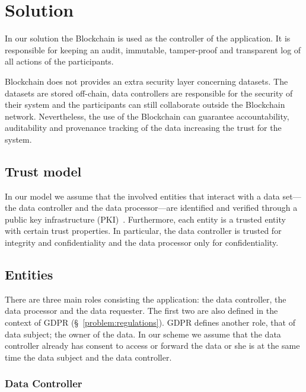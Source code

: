\chapter{Solution}
\label{solution}

In our solution the Blockchain is used as the controller of the application. It is responsible for keeping an
audit, immutable, tamper-proof and transparent log of all actions of the participants.

Blockchain does not provides an extra security layer concerning datasets. The datasets are stored off-chain, data controllers are responsible for the security of their system and the participants can still collaborate outside the Blockchain network. Nevertheless, the use of the Blockchain can guarantee accountability, auditability and provenance tracking of the data increasing the trust for the system.

\section{Trust model}
\label{solution:trust_model}

In our model we assume that the involved entities that interact with a data set---the data controller and the data processor---are identified and verified through a public key infrastructure (PKI)~\cite{adams_understanding_2003}. Furthermore, each entity is a trusted entity with certain trust properties. In particular, the data controller is trusted for integrity and confidentiality and the data processor only for confidentiality.

\section{Entities}
\label{solution:entities}

There are three main roles consisting the application: the data controller, the data processor
and the data requester. The first two are also defined in the context of GDPR (§~\ref{problem:regulations}).
GDPR defines another role, that of data subject; the owner of the data.
In our scheme we assume that the data controller already has consent to access or forward the data or she is at the same time the data subject and the data controller.

\subsection{Data Controller}
\label{solution:entities:data_controller}

